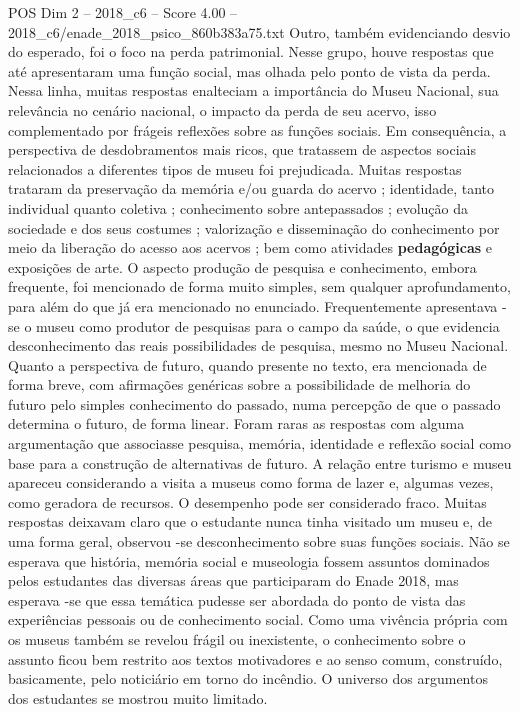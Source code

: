 \begin{textsample}{POS Dim 2 – 2018\_c6 – Score 4.00 – 2018\_c6/enade\_2018\_psico\_860b383a75.txt}
Outro, também evidenciando desvio do esperado, foi o foco na perda patrimonial.
Nesse grupo, houve respostas que até apresentaram uma função social, mas olhada pelo ponto de vista da perda.
Nessa linha, muitas respostas enalteciam a importância do Museu Nacional, sua relevância no cenário nacional, o impacto da perda de seu acervo, isso complementado por frágeis reflexões sobre as funções sociais.
Em consequência, a perspectiva de desdobramentos mais ricos, que tratassem de aspectos sociais relacionados a diferentes tipos de museu foi prejudicada.
Muitas respostas trataram da preservação da memória e/ou guarda do acervo ; identidade, tanto individual quanto coletiva ; conhecimento sobre antepassados ; evolução da sociedade e dos seus costumes ; valorização e disseminação do conhecimento por meio da liberação do acesso aos acervos ; bem como atividades \textbf{pedagógicas} e exposições de arte.
O aspecto produção de pesquisa e conhecimento, embora frequente, foi mencionado de forma muito simples, sem qualquer aprofundamento, para além do que já era mencionado no enunciado.
Frequentemente apresentava -se o museu como produtor de pesquisas para o campo da saúde, o que evidencia desconhecimento das reais possibilidades de pesquisa, mesmo no Museu Nacional.
Quanto a perspectiva de futuro, quando presente no texto, era mencionada de forma breve, com afirmações genéricas sobre a possibilidade de melhoria do futuro pelo simples conhecimento do passado, numa percepção de que o passado determina o futuro, de forma linear.
Foram raras as respostas com alguma argumentação que associasse pesquisa, memória, identidade e reflexão social como base para a construção de alternativas de futuro.
A relação entre turismo e museu apareceu considerando a visita a museus como forma de lazer e, algumas vezes, como geradora de recursos.
O desempenho pode ser considerado fraco.
Muitas respostas deixavam claro que o estudante nunca tinha visitado um museu e, de uma forma geral, observou -se desconhecimento sobre suas funções sociais.
Não se esperava que história, memória social e museologia fossem assuntos dominados pelos estudantes das diversas áreas que participaram do Enade 2018, mas esperava -se que essa temática pudesse ser abordada do ponto de vista das experiências pessoais ou de conhecimento social.
Como uma vivência própria com os museus também se revelou frágil ou inexistente, o conhecimento sobre o assunto ficou bem restrito aos textos motivadores e ao senso comum, construído, basicamente, pelo noticiário em torno do incêndio.
O universo dos argumentos dos estudantes se mostrou muito limitado.

\end{textsample}
